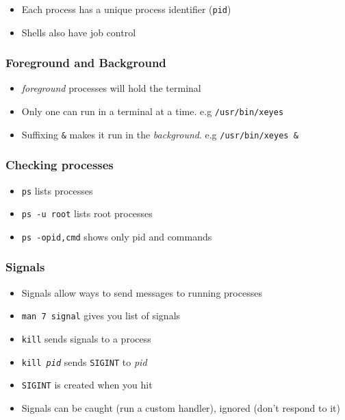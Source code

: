\begin{itemize}
\item Each process has a unique process identifier (\texttt{pid})
\item Shells also have job control
\end{itemize}
\subsubsection{Foreground and Background}
\begin{itemize}
\item \emph{foreground} processes will hold the terminal
\item Only one can run in a terminal at a time. e.g \texttt{/usr/bin/xeyes}
\item Suffixing \texttt{\&} makes it run in the \emph{background}. e.g  \texttt{/usr/bin/xeyes \&}
\end{itemize}
\subsubsection{Checking processes}
\begin{itemize}
\item \texttt{ps} lists processes
\item \texttt{ps -u root} lists root processes
\item \texttt{ps -opid,cmd} shows only pid and commands
\end{itemize}
\subsubsection{Signals}
\begin{itemize}
\item Signals allow ways to send messages to running processes
\item \texttt{man 7 signal} gives you list of signals
\item \texttt{kill} sends signals to a process
\item \texttt{kill \textit{pid}} sends \texttt{SIGINT} to \textit{pid}
\item \texttt{SIGINT} is created when you hit \keys{\ctrl} 
\item Signals can be caught (run a custom handler), ignored (don't
  respond to it)
\end{itemize}
